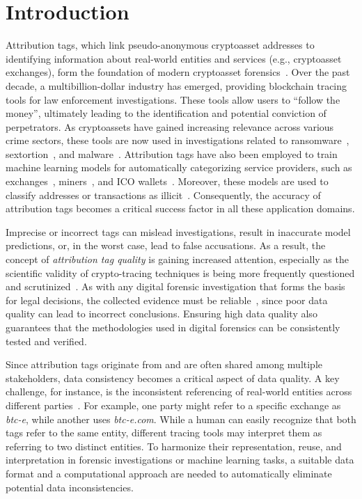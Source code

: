 
\section{Introduction}
\label{sec:introduction}

Attribution tags, which link pseudo-anonymous cryptoasset addresses to identifying information about real-world entities and services (e.g., cryptoasset exchanges), form the foundation of modern cryptoasset forensics~\cite{Meiklejohn2013}. Over the past decade, a multibillion-dollar industry has emerged, providing blockchain tracing tools for law enforcement investigations. These tools allow users to ``follow the money'', ultimately leading to the identification and potential conviction of perpetrators. As cryptoassets have gained increasing relevance across various crime sectors, these tools are now used in investigations related to ransomware~\cite{Huang2018, PaquetCloustonRansomware2019}, sextortion~\cite{PaquetCloustonSextortion2019}, and malware~\cite{Gomez2022}. Attribution tags have also been employed to train machine learning models for automatically categorizing service providers, such as exchanges~\cite{Harlev2018, Gomez2022, Liu2022, Zhou2022}, miners~\cite{Harlev2018, Liu2022, Zhou2022}, and ICO wallets~\cite{Liu2022, Zhou2022}. Moreover, these models are used to classify addresses or transactions as illicit~\cite{Liu2022, Zhou2022, Wu2022, Li2022, Hu2023, Chen2019, Bartoletti2020}. Consequently, the accuracy of attribution tags becomes a critical success factor in all these application domains.

Imprecise or incorrect tags can mislead investigations, result in inaccurate model predictions, or, in the worst case, lead to false accusations. As a result, the concept of \emph{attribution tag quality} is gaining increased attention, especially as the scientific validity of crypto-tracing techniques is being more frequently questioned and scrutinized~\cite{Change:2023}. As with any digital forensic investigation that forms the basis for legal decisions, the collected evidence must be reliable~\cite{Frwis2020}, since poor data quality can lead to incorrect conclusions. Ensuring high data quality also guarantees that the methodologies used in digital forensics can be consistently tested and verified.

Since attribution tags originate from and are often shared among multiple stakeholders, data consistency becomes a critical aspect of data quality. A key challenge, for instance, is the inconsistent referencing of real-world entities across different parties~\cite{Frwis2020,Gomez2022}. For example, one party might refer to a specific exchange as \emph{btc-e}, while another uses \emph{btc-e.com}. While a human can easily recognize that both tags refer to the same entity, different tracing tools may interpret them as referring to two distinct entities. To harmonize their representation, reuse, and interpretation in forensic investigations or machine learning tasks, a suitable data format and a computational approach are needed to automatically eliminate potential data inconsistencies.


